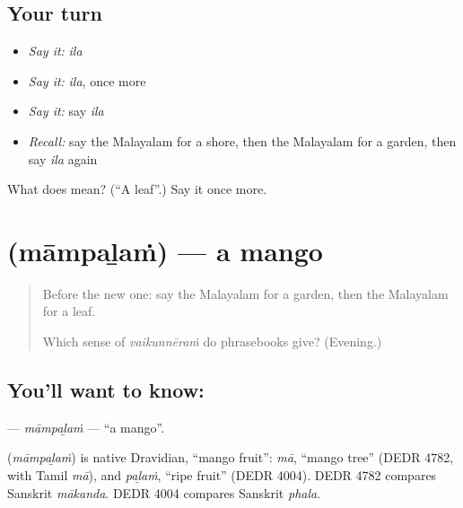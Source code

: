 \subsection*{Your turn}
\begin{itemize}
\raggedright
  \item \emph{Say it:} \emph{ila}
  \item \emph{Say it:} \emph{ila}, once more
  \item \emph{Say it:} say \emph{ila}
  \item \emph{Recall:} say the Malayalam for a shore, then the Malayalam for a garden, then say \emph{ila} again
\end{itemize}

\begin{tcolorbox}[breakable,colback=teal!4,colframe=teal!35!black,title={Before you move on}]
What does  mean? (\textquotedblleft{}A leaf\textquotedblright{}.) Say it once more.
\end{tcolorbox}
\section[\texorpdfstring{\ml{മാമ്പഴം} (māmpaḻaṁ)}{മാമ്പഴം (māmpaḻaṁ)}]{ (māmpaḻaṁ) — a mango}

\label{lesson:ML-C149-mambalam}



\begin{quote}
Before the new one: say the Malayalam for a garden, then the Malayalam for a leaf.

Which sense of \emph{vaikunnēraṁ} do phrasebooks give? (Evening.)
\end{quote}

\subsection*{You'll want to know: }
\textbf{} — \emph{māmpaḻaṁ} — \textquotedblleft{}a mango\textquotedblright{}.

\begin{cousinweb}
\textbf{} (\emph{māmpaḻaṁ}) is native Dravidian, \textquotedblleft{}mango fruit\textquotedblright{}: \emph{mā}, \textquotedblleft{}mango tree\textquotedblright{} (DEDR 4782, with Tamil \emph{mā}), and \emph{paḻaṁ}, \textquotedblleft{}ripe fruit\textquotedblright{} (DEDR 4004). DEDR 4782 compares Sanskrit \emph{mākanda}. DEDR 4004 compares Sanskrit \emph{phala}.
\end{cousinweb}

